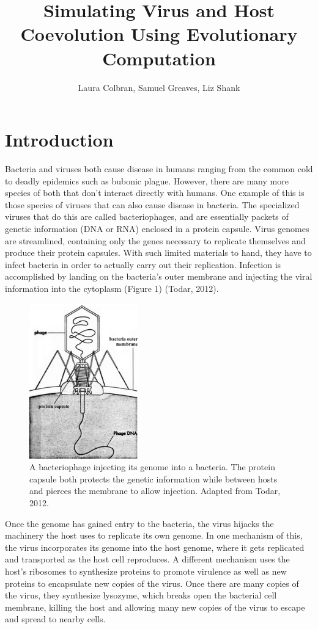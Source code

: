 \documentclass[11pt, oneside]{article}
\title{Simulating Virus and Host Coevolution Using Evolutionary Computation}
\author{Laura Colbran, Samuel Greaves, Liz Shank}
\date{}
\begin{document}
\maketitle
\section{Introduction}
Bacteria and viruses both cause disease in humans ranging from the common cold to deadly epidemics such as bubonic plague. However, there are many more species of both that don't interact directly with humans. One example of this is those species of viruses that can also cause disease in bacteria. The specialized viruses that do this are called bacteriophages, and are essentially packets of genetic information (DNA or RNA) enclosed in a protein capsule. Virus genomes are streamlined, containing only the genes necessary to replicate themselves and produce their protein capsules. With such limited materials to hand, they have to infect bacteria in order to actually carry out their replication. Infection is accomplished by landing on the bacteria's outer membrane and injecting the viral information into the cytoplasm (Figure 1) (Todar, 2012).

\begin{figure}[H]
	\centering
	\includegraphics[width=0.42\textwidth]{figure1.png}
	\caption{A bacteriophage injecting its genome into a bacteria. The protein capsule both protects the 		genetic information while between hosts and pierces the membrane to allow injection. Adapted from Todar, 2012.}
\end{figure}

Once the genome has gained entry to the bacteria, the virus hijacks the machinery the host uses to replicate its own genome. In one mechanism of this, the virus incorporates its genome into the host genome, where it gets replicated and transported as the host cell reproduces. A different mechanism uses the host's ribosomes to synthesize proteins to promote virulence as well as new proteins to encapsulate new copies of the virus. Once there are many copies of the virus, they synthesize lysozyme, which breaks open the bacterial cell membrane, killing the host and allowing many new copies of the virus to escape and spread to nearby cells.
\end{document}
